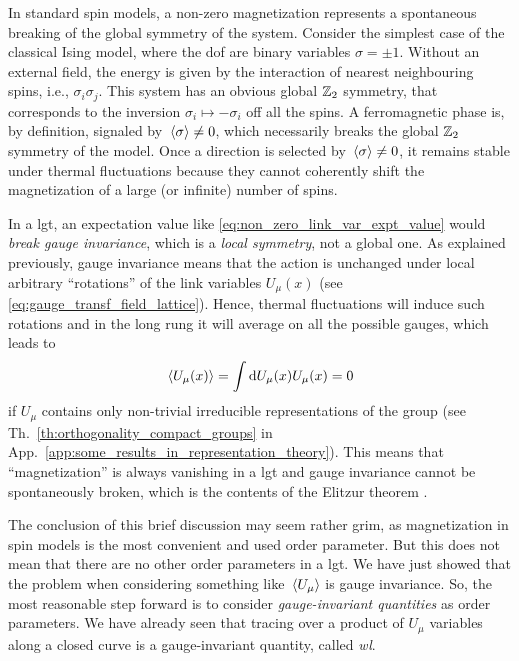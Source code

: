In standard spin models, a non-zero magnetization represents a spontaneous breaking of the global symmetry of the system.
Consider the simplest case of the classical Ising model, where the \ac{dof} are binary variables $\sigma = \pm 1$.
Without an external field, the energy is given by the interaction of nearest neighbouring spins, i.e., $\sigma_i \sigma_j$.
This system has an obvious global $\mathbb{Z}_2$ symmetry, that corresponds to the inversion $\sigma_i \mapsto -\sigma_i$ off all the spins.
A ferromagnetic phase is, by definition, signaled by $\ev*{\sigma} \neq 0$, which necessarily breaks the global $\mathbb{Z}_2$ symmetry of the model.
Once a direction is selected by $\ev*{\sigma} \neq 0$, it remains stable under thermal fluctuations because they cannot coherently shift the magnetization of a large (or infinite) number of spins.

In a \ac{lgt}, an expectation value like \eqref{eq:non_zero_link_var_expt_value} would \emph{break gauge invariance}, which is a \emph{local symmetry}, not a global one.
As explained previously, gauge invariance means that the action is unchanged under local arbitrary ``rotations'' of the link variables $U_{\mu}(x)$ (see \eqref{eq:gauge_transf_field_lattice}).
Hence, thermal fluctuations will induce such rotations and in the long rung it will average on all the possible gauges, which leads to
\begin{equation}
    \ev*{U_{\mu}(x)} = \int \dd U_{\mu}(x) U_{\mu}(x) = 0
\end{equation}
if $U_{\mu}$ contains only non-trivial irreducible representations of the group (see Th.~\ref{th:orthogonality_compact_groups} in App.~\ref{app:some_results_in_representation_theory}).
This means that ``magnetization'' is always vanishing in a \ac{lgt} and gauge invariance cannot be spontaneously broken, which is the contents of the Elitzur theorem \cite{elitzur1975theorem}.

The conclusion of this brief discussion may seem rather grim, as magnetization in spin models is the most convenient and used order parameter.
But this does not mean that there are no other order parameters in a \ac{lgt}.
We have just showed that the problem when considering something like $\ev*{U_{\mu}}$ is gauge invariance.
So, the most reasonable step forward is to consider \emph{gauge-invariant quantities} as order parameters.
We have already seen that tracing over a product of $U_{\mu}$ variables along a closed curve is a gauge-invariant quantity, called \emph{\ac{wl}}.

